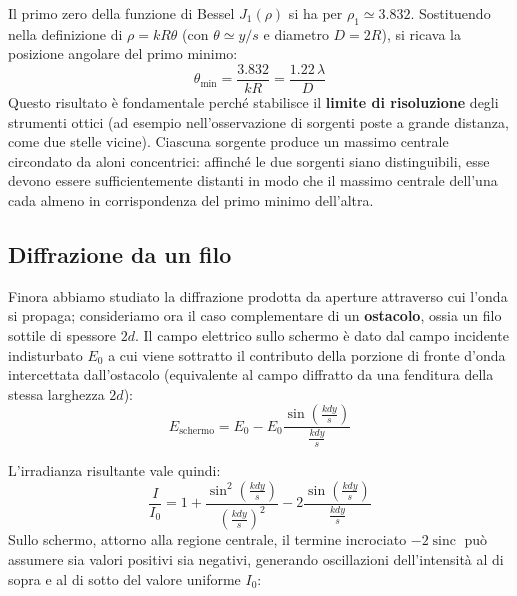 \documentclass[openany,a4paper,12pt]{book}
\begin{document}
Il primo zero della funzione di Bessel $J_1(\rho)$ si ha per $\rho_1 \simeq \num{3.832}$. Sostituendo nella definizione di $\rho = k R \theta$ (con $\theta \simeq y/s$ e diametro $D = 2R$), si ricava la posizione angolare del primo minimo:
\[
    \theta_{\min} = \frac{\num{3.832}}{k R} = \frac{\num{1.22}\,\lambda}{D}
\]
Questo risultato è fondamentale perché stabilisce il \textbf{limite di risoluzione} degli strumenti ottici (ad esempio nell'osservazione di sorgenti poste a grande distanza, come due stelle vicine). Ciascuna sorgente produce un massimo centrale circondato da aloni concentrici: affinché le due sorgenti siano distinguibili, esse devono essere sufficientemente distanti in modo che il massimo centrale dell'una cada almeno in corrispondenza del primo minimo dell'altra.

\subsection*{Diffrazione da un filo}

Finora abbiamo studiato la diffrazione prodotta da aperture attraverso cui l'onda si propaga; consideriamo ora il caso complementare di un \textbf{ostacolo}, ossia un filo sottile di spessore $2d$.
Il campo elettrico sullo schermo è dato dal campo incidente indisturbato $E_0$ a cui viene sottratto il contributo della porzione di fronte d'onda intercettata dall'ostacolo (equivalente al campo diffratto da una fenditura della stessa larghezza $2d$):
\begin{equation}
    E_{\text{schermo}} = E_0 - E_0 \frac{\sin\left(\frac{k d y}{s}\right)}{\frac{k d y}{s}}
\end{equation}

L'irradianza risultante vale quindi:
\begin{equation}
    \frac{I}{I_0} = 1 + \frac{\sin^2\left(\frac{k d y}{s}\right)}{\left(\frac{k d y}{s}\right)^2} - 2 \frac{\sin\left(\frac{k d y}{s}\right)}{\frac{k d y}{s}}
\end{equation}
Sullo schermo, attorno alla regione centrale, il termine incrociato $-2\operatorname{sinc}$ può assumere sia valori positivi sia negativi, generando oscillazioni dell'intensità al di sopra e al di sotto del valore uniforme $I_0$:
\end{document}
